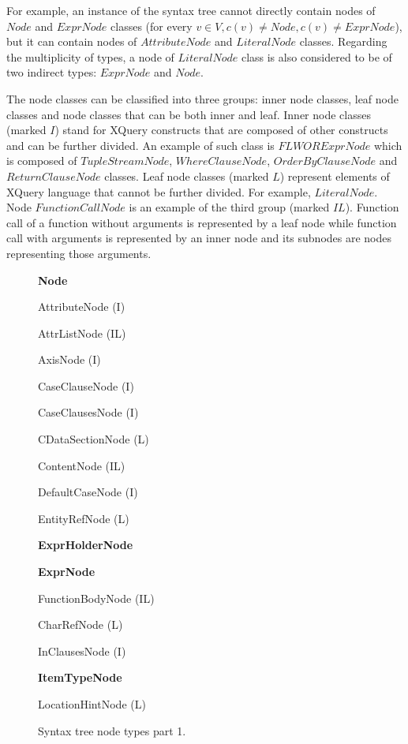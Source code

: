 For example, an instance of the syntax tree cannot directly contain nodes of $Node$ and $ExprNode$ classes (for every $v \in V, c(v) \neq Node, c(v) \neq ExprNode$), but it can contain nodes of $AttributeNode$ and $LiteralNode$ classes. Regarding the multiplicity of types, a node of $LiteralNode$ class is also considered to be of two indirect types: $ExprNode$ and $Node$.


The node classes can be classified into three groups: inner node classes, leaf node classes and node classes that can be both inner and leaf. Inner node classes (marked $I$) stand for XQuery constructs that are composed of other constructs and can be further divided. An example of such class is $FLWORExprNode$ which is composed of $TupleStreamNode$, $WhereClauseNode$, $OrderByClauseNode$ and $ReturnClauseNode$ classes. Leaf node classes (marked $L$) represent elements of XQuery language that cannot be further divided. For example, $LiteralNode$. Node $FunctionCallNode$ is an example of the third group (marked $IL$). Function call of a function without arguments is represented by a leaf node while function call with arguments is represented by an inner node and its subnodes are nodes representing those arguments.

\begin{figure}
\caption{Syntax tree node types part 1.}
\label{FIG_syntax_tree_node_types_part_1}
\begin{description}
\item \textbf{Node}
\begin{description}
\item AttributeNode (I)
\item AttrListNode (IL)
\item AxisNode (I)
\item CaseClauseNode (I)
\item CaseClausesNode (I)
\item CDataSectionNode (L)
\item ContentNode (IL)
\item DefaultCaseNode (I)
\item EntityRefNode (L)
\item \textbf{ExprHolderNode}
\item \textbf{ExprNode}
\item FunctionBodyNode (IL)
\item CharRefNode (L)
\item InClausesNode (I)
\item \textbf{ItemTypeNode}
\item LocationHintNode (L)
\end{description}
\end{description}
\end{figure}

